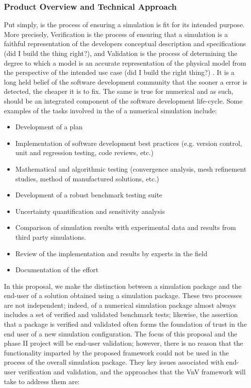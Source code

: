 \subsubsection{Product Overview and Technical Approach}

Put simply, \VV is the process of ensuring a simulation is fit for its intended purpose. More precisely, Verification is the process of ensuring that a simulation is a faithful representation of the developers conceptual description and specifications (did I build the thing right?), and Validation is the process of determining the degree to which a model is an accurate representation of the physical model from the perspective of the intended use case (did I build the right thing?) \cite{DOD-VVA}. It is a long held belief of the software development community that the sooner a error is detected, the cheaper it is to fix. The same is true for numerical \MS and as such, \VV should be an integrated component of the software development life-cycle. Some examples of the tasks involved in the \VV of a numerical simulation include:

\begin{itemize}
 \item Development of a \VV plan
 \item Implementation of software development best practices (e.g. version control, unit and regression testing, code reviews, etc.)
 \item Mathematical and algorithmic testing (convergence analysis, mesh refinement studies, method of manufactured solutions, etc.)
 \item Development of a robust benchmark testing suite
 \item Uncertainty quantification and sensitivity analysis
 \item Comparison of simulation results with experimental data and results from third party simulations. 
 \item Review of the implementation and results by experts in the field
 \item Documentation of the \VV effort
\end{itemize}

In this proposal, we make the distinction between \VV a simulation package and the end-user \VV of a solution obtained using a simulation package. These two processes are not independent; indeed, \VV of a numerical simulation 
package almost always includes a set of verified and validated benchmark tests; likewise, the assertion that a package is verified and validated often forms the foundation of trust in the end user \VV of a new simulation configuration. The focus of this proposal and the phase II project will be end-user validation; however, there is no reason that the functionality imparted by the proposed framework could not be used in the \VV process of the overall simulation package. They key issues associated with end-user verification and validation, and the approaches that the VnV framework will take to address them are:

